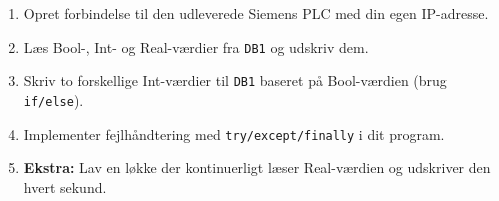 \documentclass[12pt, a4paper]{article}
\begin{document}
\begin{tcolorbox}[tipbox, title={\faTasks\quad Øvelsesopgaver}]
\begin{enumerate}[leftmargin=1.5em, itemsep=6pt]
  \item Opret forbindelse til den udleverede Siemens PLC med din egen IP-adresse.
  \item Læs Bool-, Int- og Real-værdier fra \texttt{DB1} og udskriv dem.
  \item Skriv to forskellige Int-værdier til \texttt{DB1} baseret på Bool-værdien (brug \texttt{if/else}).
  \item Implementer fejlhåndtering med \texttt{try/except/finally} i dit program.
  \item \textbf{Ekstra:} Lav en løkke der kontinuerligt læser Real-værdien og udskriver den hvert sekund.
\end{enumerate}
\end{tcolorbox}
\end{document}
